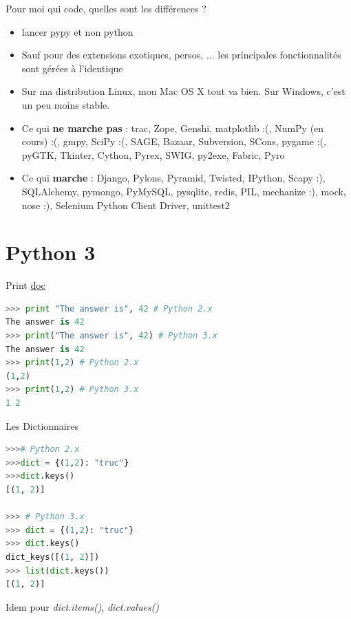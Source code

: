 \documentclass{beamer}
\begin{document}
\begin{frame}[fragile]{Pour moi qui code, quelles sont les différences ?}
\begin{itemize}
 \item lancer pypy et non python
 \item Sauf pour des extensions exotiques, persos, ... les principales fonctionnalités sont gérées à l'identique
 \item Sur ma distribution Linux, mon Mac OS X tout va bien. Sur Windows, c'est un peu moins stable.
 \item Ce qui \textbf{ne marche pas} : \small trac, Zope, Genshi, matplotlib :(, NumPy (en cours) :(, gmpy, SciPy :(, SAGE, Bazaar, Subversion, SCons, pygame :(, pyGTK, Tkinter, Cython, Pyrex, SWIG, py2exe, Fabric, Pyro
 \item Ce qui \textbf{marche} : \small Django, Pylons, Pyramid, Twisted, IPython, Scapy :), SQLAlchemy, pymongo, PyMySQL, pysqlite, redis, PIL, mechanize :), mock, nose :), Selenium Python Client Driver, unittest2
\end{itemize}
\end{frame}


\section{Python 3}

\begin{frame}[fragile]{Print}
\underline{\href{http://docs.python.org/release/3.0.1/whatsnew/3.0.html}{doc}}


\begin{lstlisting}[language=python]
>>> print "The answer is", 42 # Python 2.x
The answer is 42
>>> print("The answer is", 42) # Python 3.x
The answer is 42
>>> print(1,2) # Python 2.x
(1,2)
>>> print(1,2) # Python 3.x
1 2
\end{lstlisting}

\end{frame}

\begin{frame}[fragile]{Les Dictionnaires}
\begin{lstlisting}[language=python, multicols=2]
>>># Python 2.x
>>>dict = {(1,2): "truc"}
>>>dict.keys()
[(1, 2)]

>>> # Python 3.x
>>> dict = {(1,2): "truc"}
>>> dict.keys()
dict_keys([(1, 2)])
>>> list(dict.keys())
[(1, 2)]
\end{lstlisting}

Idem pour \textit{dict.items()}, \textit{dict.values()}
\end{frame}
\end{document}
